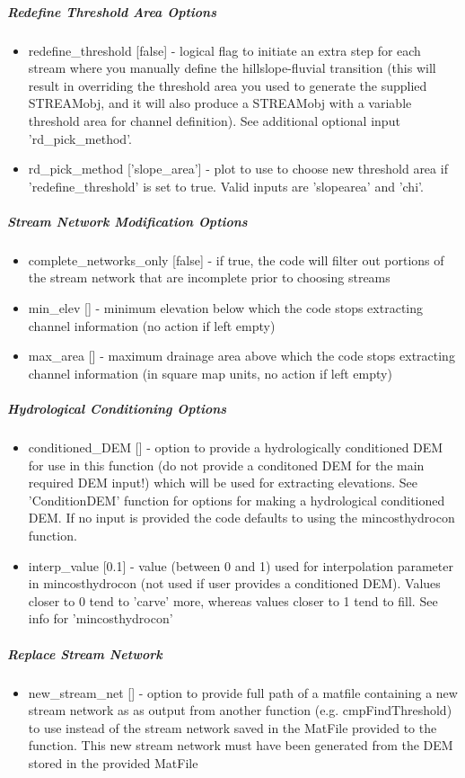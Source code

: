 \subparagraph{Redefine Threshold Area Options}
\begin{itemize}
\item redefine\_threshold [false] - logical flag to initiate an extra step for each stream where you manually define the hillslope-fluvial 
transition (this will result in overriding the threshold area you used to generate the supplied STREAMobj, and it will also produce
a STREAMobj with a variable threshold area for channel definition). See additional optional input 'rd\_pick\_method'.
\item rd\_pick\_method ['slope\_area'] - plot to use to choose new threshold area if 'redefine\_threshold' is set to true. Valid inputs are 
'slopearea' and 'chi'.
\end{itemize}

\subparagraph{Stream Network Modification Options}
\begin{itemize}
\item complete\_networks\_only [false] - if true, the code will filter out portions of the stream network that are incomplete prior to choosing
streams
\item min\_elev [] - minimum elevation below which the code stops extracting channel information (no action if left empty)
\item max\_area [] - maximum drainage area above which the code stops extracting channel information (in square map units, no action if left empty)
\end{itemize}

\subparagraph{Hydrological Conditioning Options}
\begin{itemize}
\item conditioned\_DEM [] - option to provide a hydrologically conditioned DEM for use in this function (do not provide a conditoned DEM
for the main required DEM input!) which will be used for extracting elevations. See 'ConditionDEM' function for options 
for making a hydrological conditioned DEM. If no input is provided the code defaults to using the mincosthydrocon function.
\item interp\_value [0.1] - value (between 0 and 1) used for interpolation parameter in mincosthydrocon (not used if user provides a 
conditioned DEM). Values closer to 0 tend to 'carve' more, whereas values closer to 1 tend to fill. See info for 
'mincosthydrocon'
\end{itemize}

\subparagraph{Replace Stream Network}
\begin{itemize}
\item new\_stream\_net [] - option to provide full path of a matfile containing a new stream network as as output from another function (e.g. cmpFindThreshold) to use
instead of the stream network saved in the MatFile provided to the function. This new stream network must have been generated from the
DEM stored in the provided MatFile
\end{itemize}

